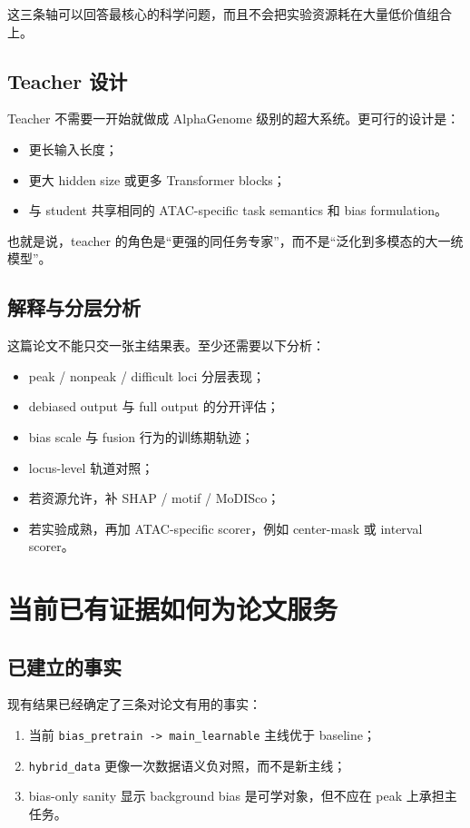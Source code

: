 \documentclass[11pt,a4paper]{ctexart}
\begin{document}
这三条轴可以回答最核心的科学问题，而且不会把实验资源耗在大量低价值组合上。

\subsection{Teacher 设计}
Teacher 不需要一开始就做成 AlphaGenome 级别的超大系统。更可行的设计是：
\begin{itemize}[leftmargin=2em]
  \item 更长输入长度；
  \item 更大 hidden size 或更多 Transformer blocks；
  \item 与 student 共享相同的 ATAC-specific task semantics 和 bias formulation。
\end{itemize}

也就是说，teacher 的角色是“更强的同任务专家”，而不是“泛化到多模态的大一统模型”。

\subsection{解释与分层分析}
这篇论文不能只交一张主结果表。至少还需要以下分析：
\begin{itemize}[leftmargin=2em]
  \item peak / nonpeak / difficult loci 分层表现；
  \item debiased output 与 full output 的分开评估；
  \item bias scale 与 fusion 行为的训练期轨迹；
  \item locus-level 轨道对照；
  \item 若资源允许，补 SHAP / motif / MoDISco；
  \item 若实验成熟，再加 ATAC-specific scorer，例如 center-mask 或 interval scorer。
\end{itemize}

\section{当前已有证据如何为论文服务}

\subsection{已建立的事实}
现有结果已经确定了三条对论文有用的事实：
\begin{enumerate}[leftmargin=2em]
  \item 当前 \texttt{bias\_pretrain -> main\_learnable} 主线优于 baseline；
  \item \texttt{hybrid\_data} 更像一次数据语义负对照，而不是新主线；
  \item bias-only sanity 显示 background bias 是可学对象，但不应在 peak 上承担主任务。
\end{enumerate}
\end{document}
